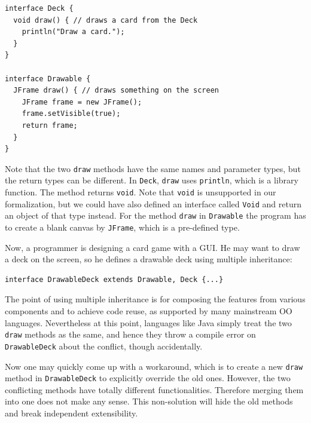 \vspace{3pt}\begin{lstlisting}
interface Deck {
  void draw() { // draws a card from the Deck
    println("Draw a card.");
  }
}

interface Drawable {
  JFrame draw() { // draws something on the screen
    JFrame frame = new JFrame();
    frame.setVisible(true);
    return frame;
  }
}
\end{lstlisting}\vspace{3pt}
Note that the two \lstinline|draw| methods have the same names and parameter types,
but the return types can be different. In \lstinline|Deck|,
\lstinline|draw| uses \lstinline|println|, which is a
library function. 
The method returns \lstinline|void|. Note that \lstinline|void| is
unsupported in our formalization, but we could have also defined an interface called \lstinline|Void|
and return an object of that type instead. For the method \lstinline|draw| in
\lstinline|Drawable|
the program has to create a blank canvas by \lstinline|JFrame|, which
is a pre-defined type.

Now, a programmer is designing a
card game with a GUI. He may want to draw a deck on the screen, so he defines a drawable
deck using multiple inheritance:

\vspace{3pt}\begin{lstlisting}
interface DrawableDeck extends Drawable, Deck {...} 
\end{lstlisting}\vspace{3pt}
The point of using multiple inheritance is for composing the features from various 
components and to achieve code reuse, as supported by many mainstream OO
languages. Nevertheless at this point, languages like Java simply treat the two \lstinline|draw| methods
as the same, and hence they throw a compile error on \lstinline|DrawableDeck| about the conflict, though accidentally.

Now one may quickly come up with a workaround, which is to create a new \lstinline|draw| method in \lstinline|DrawableDeck| to
explicitly override the old ones. However, the two conflicting methods
have totally different functionalities. Therefore merging
them into one does not make any sense. This non-solution will hide the
old methods and break independent extensibility. 


